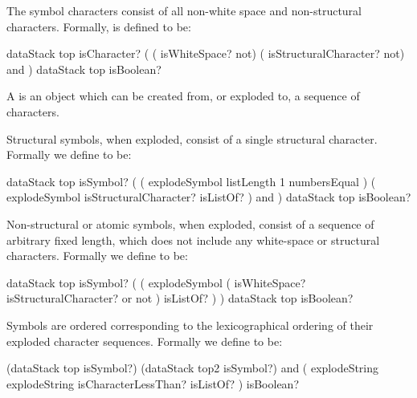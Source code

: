 \stoptyping

The symbol characters consist of all non-white space and non-structural 
characters. Formally,  is defined to 
be: 

\starttyping
{ dataStack top isCharacter? }
(
  ( isWhiteSpace? not)
  ( isStructuralCharacter? not)
  and
)
{ dataStack top isBoolean? }
\stoptyping

\stopDefinition

\subChapterAppendix[title=Symbols, reference=symbolSpec]


\startDefinition 

A  is an object which can be created from, or exploded to, 
a sequence of characters. 

Structural symbols, when exploded, consist of a single structural 
character. Formally we define  to 
be: 

\starttyping
{ dataStack top isSymbol? }
(
  ( explodeSymbol listLength 1 numbersEqual )
  ( explodeSymbol isStructuralCharacter? isListOf? )
  and
)
{ dataStack top isBoolean? }
\stoptyping

Non-structural or atomic symbols, when exploded, consist of a sequence of 
arbitrary fixed length, which does not include any white-space or 
structural characters. Formally we define 
 to be: 

\starttyping
{ dataStack top isSymbol? }
(
  ( 
    explodeSymbol
    ( isWhiteSpace? isStructuralCharacter?  or not )
    isListOf?
  )
)
{ dataStack top isBoolean? }
\stoptyping


Symbols are ordered corresponding to the lexicographical ordering of their 
exploded character sequences. Formally we define 
 to be: 

\starttyping
{
  (dataStack top isSymbol?)
  (dataStack top2 isSymbol?)
  and
}
( explodeString explodeString isCharacterLessThan? isListOf?
)
{ isBoolean? }
\stoptyping


\stopDefinition

\subChapterAppendix[title=Texts, reference=textSpec]

